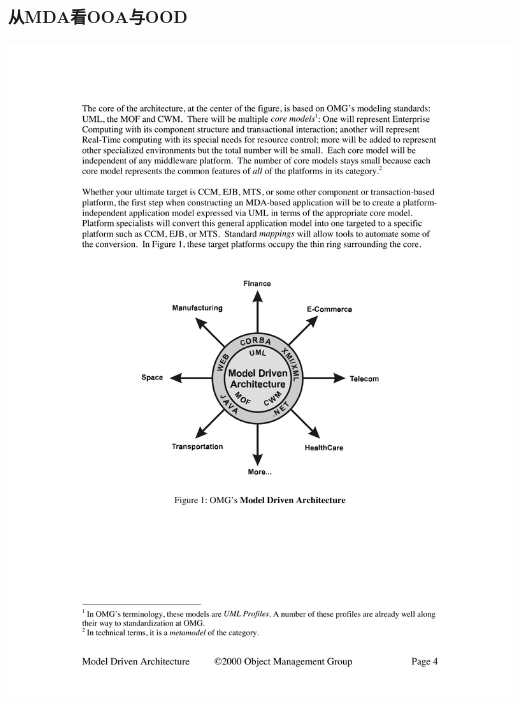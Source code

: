 \documentclass[compress]{beamer}
\begin{document}
\begin{frame}
  \frametitle{从MDA看OOA与OOD}
    \begin{center}
      \centering\includegraphics[width=0.8\hsize]{mda.pdf}
    \end{center}

\end{frame}
\end{document}
